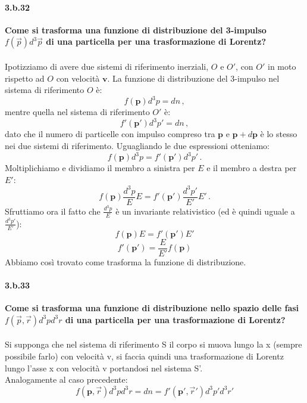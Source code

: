 \documentclass[twoside]{article}
\begin{document}
\paragraph{3.b.32} \textbf{Come si trasforma una funzione di distribuzione del 3-impulso $f(\vec{p})d^3\vec{p}$ di una particella per una trasformazione di Lorentz?}\\
\\
Ipotizziamo di avere due sistemi di riferimento inerziali, $O$ e $O'$, con $O'$ in moto rispetto ad $O$ con velocità $\mathbf{v}$. La funzione di distribuzione del 3-impulso nel sistema di riferimento $O$ è:
\begin{equation*}
f(\mathbf{p})d^3p=dn \, ,
\end{equation*}
mentre quella nel sistema di riferimento $O'$ è:
\begin{equation*}
f'(\mathbf{p'})d^3p'=dn \, ,
\end{equation*}
dato che il numero di particelle con impulso compreso tra $\mathbf{p}$ e $\mathbf{p}+d\mathbf{p}$ è lo stesso nei due sistemi di riferimento. Uguagliando le due espressioni otteniamo:
\begin{equation*}
f(\mathbf{p})d^3p=f'(\mathbf{p'})d^3p' \, .
\end{equation*}
Moltiplichiamo e dividiamo il membro a sinistra per $E$ e il membro a destra per $E'$:
\begin{equation*}
f(\mathbf{p})\frac{d^3p}{E}E=f'(\mathbf{p'})\frac{d^3p'}{E'}E' \, .
\end{equation*}
Sfruttiamo ora il fatto che $\frac{d^3p}{E}$ è un invariante relativistico (ed è quindi uguale a $\frac{d^3p'}{E'}$):
\begin{equation*}
f(\mathbf{p})E=f'(\mathbf{p'})E'
\end{equation*}
\begin{equation}
 f'(\mathbf{p'})=\frac{E}{E'}f(\mathbf{p})
\end{equation}
Abbiamo così trovato come trasforma la funzione di distribuzione.

\paragraph{3.b.33}\textbf{Come si trasforma una funzione di distribuzione nello spazio delle fasi $f(\vec{p},\vec{r})d^3pd^3r$ di una particella per una trasformazione di Lorentz?}\\ \\
Si supponga che nel sistema di riferimento S il corpo si muova lungo la x (sempre possibile farlo) con velocità v, si faccia quindi una trasformazione di Lorentz lungo l'asse x con velocità v portandosi nel sistema S'.\\
Analogamente al caso precedente:
\begin{equation}
    f(\mathbf{p},\vec{r})d^3pd^3r=dn=f'(\mathbf{p'},\vec{r}')d^3p'd^3r'
\end{equation}
\end{document}
